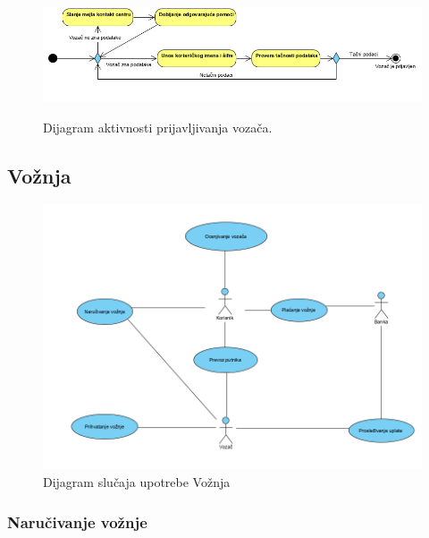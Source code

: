 \begin{figure}[H]
\begin{left}
\includegraphics[width=480,height=135]{Slike/PrijavljivanjeVozaca.png}
\end{left}
    \caption{Dijagram aktivnosti prijavljivanja vozača.}
\label{fig:PrijavljivanjeVozaca}
\end{figure}

\subsection{\bfseries Vožnja}
\begin{figure}[H]
\begin{center}
\includegraphics[scale=0.7]{Slike/VoznjaUseCase.png}
\end{center}
    \caption{Dijagram slučaja upotrebe Vožnja}
\label{fig:Vožnja}
\end{figure}


\subsubsection{\bfseries Naručivanje vožnje}

